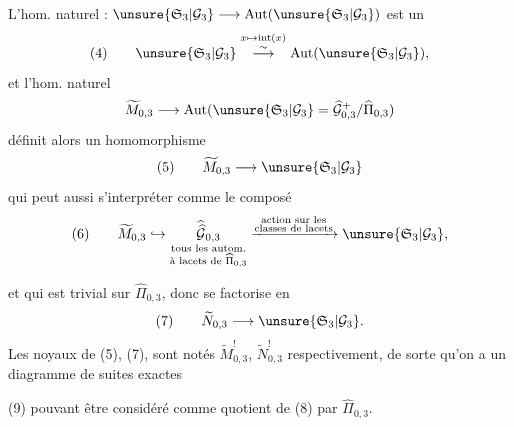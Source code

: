 L'hom. naturel : $\unsure{\mathfrak S_3|\mathcal G_3}\longrightarrow\operatorname{Aut}(\unsure{\mathfrak S_3|\mathcal G_3})$ est un 
\[
(4)\qquad\unsure{\mathfrak S_3|\mathcal G_3}\overset{x\mapsto\operatorname{int}(x)}{\overset{\sim}{\longrightarrow}}\operatorname{Aut}(\unsure{\mathfrak S_3|\mathcal G_3}),
\]
et l'hom. naturel
\[
\widetilde M_{0,3}\longrightarrow\operatorname{Aut}(\unsure{\mathfrak S_3|\mathcal G_3}=\widehat{\mathcal G}_{0,3}^{+}/\widehat{\Pi}_{0,3})
\]
définit alors un homomorphisme
\[
(5)\qquad\widetilde M_{0,3}\longrightarrow\unsure{\mathfrak S_3|\mathcal G_3}
\]
qui peut aussi s'interpréter comme le composé
\[
(6)\qquad\widetilde M_{0,3}\hookrightarrow
\underset{\substack{\text{tous les autom.}\\\text{à lacets de }\widehat{\Pi}_{0,3}}}{\widehat{\widehat{\mathcal G}}_{0,3}}
\xrightarrow{\substack{\text{action sur les}\\\text{classes de lacets}}}
\unsure{\mathfrak S_3|\mathcal G_3},
\]


et qui est trivial sur $\widehat{\Pi}_{0,3}$, donc se factorise en
\[
(7)\qquad\widetilde N_{0,3}\longrightarrow\unsure{\mathfrak S_3|\mathcal G_3}.
\]
Les noyaux de (5), (7), sont notés $\widetilde M_{0,3}^{!}$, $\widetilde N_{0,3}^{!}$ respectivement, de sorte qu'on a un diagramme de suites exactes


(9) pouvant être considéré comme quotient de (8) par $\widehat{\Pi}_{0,3}$.


